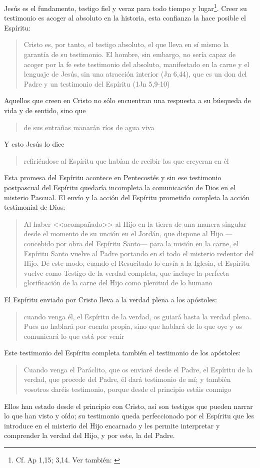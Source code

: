 Jesús es el fundamento, testigo fiel y veraz para todo tiempo y lugar\footnote{Cf. Ap 1,15; 3,14. Ver también: \cite[132]{prades2015testimonio}}. Creer su testimonio es acoger al absoluto en la historia, esta confianza la hace posible el Espíritu: \blockquote[{\cite{latourelle2000testimonio}}]{Cristo es, por tanto, el testigo absoluto, el que lleva en sí mismo la garantía de su testimonio. El hombre, sin embargo, no sería capaz de acoger por la fe este testimonio del absoluto, manifestado en la carne y el lenguaje de Jesús, sin una atracción interior (Jn 6,44), que es un don del Padre y un testimonio del Espíritu (1Jn 5,9-10)}.

Aquellos que creen en Cristo no sólo encuentran una respuesta a su búsqueda de vida y de sentido, sino que \blockquote[][\,(Jn 7,38)]{de sus entrañas manarán ríos de agua viva}. Y esto Jesús lo dice \blockquote[][\,(Jn 7,39)]{refiriéndose al Espíritu que habían de recibir los que creyeran en él}. Esta promesa del Espíritu acontece en Pentecostés y sin ese testimonio postpascual del Espíritu quedaría incompleta la comunicación de Dios en el misterio Pascual\autocite[Cf.~][135]{prades2015testimonio}. El envío y la acción del Espíritu prometido completa la acción testimonial de Dios: \blockquote[{\cite[134-135]{prades2015testimonio}}]{Al haber <<acompañado>> al Hijo en la tierra de una manera singular desde el momento de su unción en el Jordán, que dispone al Hijo ---concebido por obra del Espíritu Santo--- para la misión en la carne, el Espíritu Santo vuelve al Padre portando en sí todo el misterio redentor del Hijo. De este modo, cuando el Resucitado lo envía a la Iglesia, el Espíritu vuelve como Testigo de la verdad completa, que incluye la perfecta glorificación de la carne del Hijo como plenitud de lo humano}.

El Espíritu enviado por Cristo lleva a la verdad plena a los apóstoles: \blockquote[][\,(Jn 16,13)]{cuando venga él, el Espíritu de la verdad, os guiará hasta la verdad plena. Pues no hablará por cuenta propia, sino que hablará de lo que oye y os comunicará lo que está por venir}. Este testimonio del Espíritu completa también el testimonio de los apóstoles: \blockquote[][\,(Jn 15,26-27)]{Cuando venga el Paráclito, que os enviaré desde el Padre, el Espíritu de la verdad, que procede del Padre, él dará testimonio de mí; y también vosotros daréis testimonio, porque desde el principio estáis conmigo}. Ellos han estado desde el principio con Cristo, así son testigos que pueden narrar lo que han visto y oído; su testimonio queda perfeccionado por el Espíritu que les introduce en el misterio del Hijo encarnado y les permite interpretar y comprender la verdad del Hijo, y por este, la del Padre\autocite[Cf.~][139]{prades2015testimonio}.

